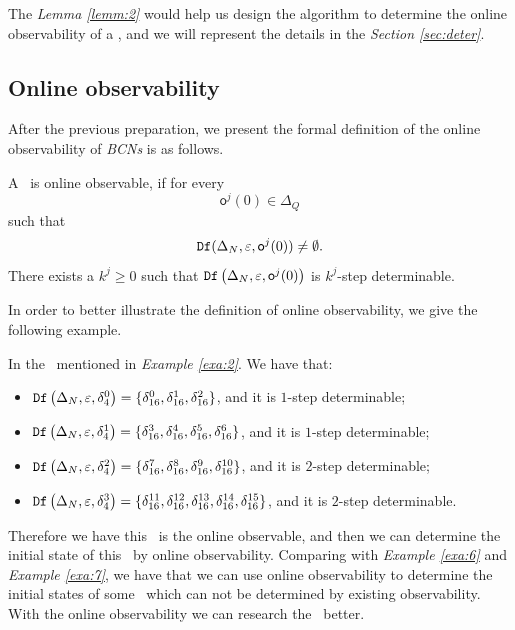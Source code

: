 The {\em Lemma \ref{lemm:2}} would help us design the algorithm to determine the online observability of a \BCN, and we will represent the details in the {\em Section \ref{sec:deter}}.

\subsection{Online observability}
After the previous preparation, we present the formal definition of the online observability of {\em BCNs} is as follows.

\begin{definition}
 A \BCN\ is online observable,
if for every \[\mathsf{o}^{j}(0)\in \Delta_Q\] such that \[{\tt Df}(\Delta_N,\varepsilon, \mathsf{o}^{j}(0))\ne \emptyset.\] There exists a $k^{j}\ge0$ such that ${\tt Df}\left(\Delta_N,\varepsilon,\mathsf{o}^{j}(0)\right)$ is $k^{j}$-step determinable.
\end{definition}

 In order to better illustrate the definition of online observability, we give the following example.

\begin{example}
In the \BCN\ mentioned in {\em Example \ref{exa:2}}.  We have that:
 \begin{itemize}
 \item ${\tt Df}\left(\Delta_N,\varepsilon, \delta_{4}^0\right)=\{\delta_{16}^0,\delta_{16}^1,\delta_{16}^2\}$, and it is $1$-step determinable;
 \item ${\tt Df}\left(\Delta_N,\varepsilon, \delta_{4}^1\right)=\{\delta_{16}^3,\delta_{16}^4,\delta_{16}^5,\delta_{16}^6\}$, and it is $1$-step determinable;
 \item ${\tt Df}\left(\Delta_N,\varepsilon, \delta_{4}^2\right)=\{\delta_{16}^7,\delta_{16}^8,\delta_{16}^{9},\delta_{16}^{10}\}$, and it is $2$-step determinable;
 \item ${\tt Df}\left(\Delta_N,\varepsilon, \delta_{4}^3\right)=\{\delta_{16}^{11},\delta_{16}^{12},\delta_{16}^{13},\delta_{16}^{14},\delta_{16}^{15}\}$, and it is $2$-step determinable.
 \end{itemize}
 
Therefore we have this \BCN\ is the online observable, and then we can determine the initial state of this \BCN\ by online observability. Comparing with {\em Example \ref{exa:6}} and {\em Example \ref{exa:7}}, we have that we can use online observability to determine the initial states of some \BCNs\ which can not be determined by existing observability. With the online observability we can research the \BCNs\ better.
\label{exa:10}
\end{example}  

